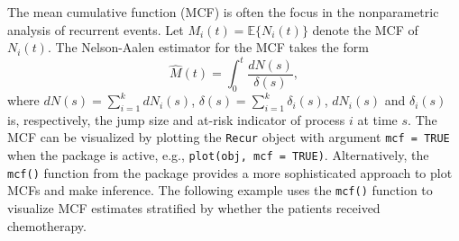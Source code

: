The mean cumulative function (MCF) is often the focus in the
nonparametric analysis of recurrent events. Let
\(M_i(t)=\mathbb{E}\{N_i(t)\}\) denote the MCF of \(N_i(t)\). The
Nelson-Aalen estimator \citep{nelson2003siam} for the MCF takes the form
\[\widehat{M}(t) = \int_0^t \frac{dN(s)}{\delta(s)},\] where
\(dN(s)=\sum_{i=1}^k dN_i(s)\),
\(\delta(s) = \sum_{i=1}^k \delta_i(s)\), \(dN_i(s)\) and
\(\delta_i(s)\) is, respectively, the jump size and at-risk indicator of
process \(i\) at time \(s\). The MCF can be visualized by plotting the
\texttt{Recur} object with argument \texttt{mcf\ =\ TRUE} when the
 package is active, e.g., \texttt{plot(obj,\ mcf\ =\ TRUE)}.
Alternatively, the \texttt{mcf()} function from the  package
provides a more sophisticated approach to plot MCFs and make inference.
The following example uses the \texttt{mcf()} function to visualize MCF
estimates stratified by whether the patients received chemotherapy.

\begin{Shaded}
\begin{Highlighting}[]
\StringTok{ }
 \NormalTok{, } \OperatorTok{:}\NormalTok{) }\OperatorTok{+}
\StringTok{    }\OperatorTok{::}\NormalTok{(} \NormalTok{) }
\end{Highlighting}
\end{Shaded}

